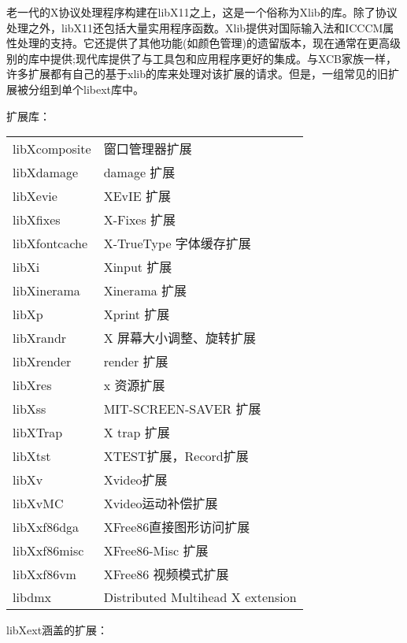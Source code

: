 老一代的X协议处理程序构建在libX11之上，这是一个俗称为Xlib的库。除了协议处理之外，libX11还包括大量实用程序函数。Xlib提供对国际输入法和ICCCM属性处理的支持。它还提供了其他功能(如颜色管理)的遗留版本，现在通常在更高级别的库中提供;现代库提供了与工具包和应用程序更好的集成。与XCB家族一样，许多扩展都有自己的基于xlib的库来处理对该扩展的请求。但是，一组常见的旧扩展被分组到单个libext库中。

\noindent 扩展库：

\begin{center}
\begin{supertabular}{|l|l|}
	libXcomposite & 窗口管理器扩展\\
	libXdamage & damage 扩展\\
	libXevie & XEvIE 扩展\\
	libXfixes & X-Fixes 扩展\\
	libXfontcache & X-TrueType 字体缓存扩展\\
	libXi & Xinput 扩展\\
	libXinerama & Xinerama 扩展\\
	libXp & Xprint 扩展\\
	libXrandr & X 屏幕大小调整、旋转扩展\\
	libXrender & render 扩展\\
	libXres & x 资源扩展\\
	libXss & MIT-SCREEN-SAVER 扩展\\
	libXTrap & X trap 扩展\\
	libXtst & XTEST扩展，Record扩展\\
	libXv & Xvideo扩展\\
	libXvMC & Xvideo运动补偿扩展\\
	libXxf86dga & XFree86直接图形访问扩展\\
	libXxf86misc & XFree86-Misc 扩展\\
	libXxf86vm & XFree86 视频模式扩展\\
	libdmx & Distributed Multihead X extension\\
	\hline
\end{supertabular}
\end{center}

\noindent libXext涵盖的扩展：

